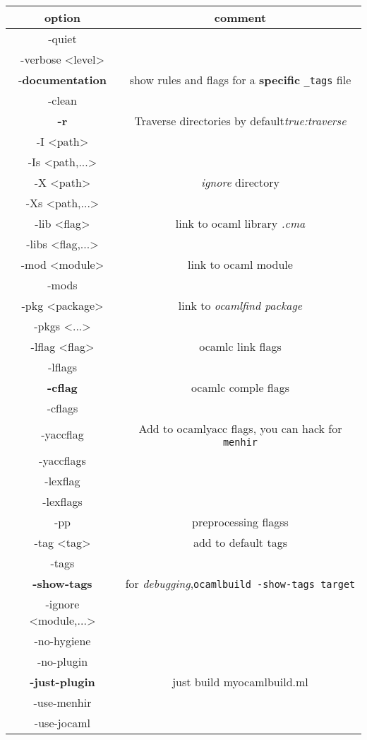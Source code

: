 \begin{longtable}{|c|c|}
  \hline
option & comment \\
  \endfirsthead
\hline
-quiet & \\
-verbose <level> & \\
-\textbf{documentation} & show rules and flags for a \textbf{specific} \verb|_tags| file
\\
-clean & \\
\textbf{-r} & Traverse directories by default\textit{true:traverse} \\
-I <path> & \\
-Is <path,...> & \\
-X <path> & \textit{ignore} directory \\
-Xs <path,...> & \\
-lib <flag> & link to ocaml library \textit{.cma} \\
-libs <flag,...> & \\
-mod <module> & link to ocaml module \\
-mods & \\
-pkg <package> & link to \textit{ocamlfind package} \\
-pkgs <...> & \\
-lflag  <flag> & ocamlc link flags \\
-lflags & \\
\textbf{-cflag} & ocamlc comple flags \\
-cflags & \\
-yaccflag &  Add to ocamlyacc flags, you can hack for \verb|menhir| \\
-yaccflags & \\
-lexflag & \\
-lexflags & \\
-pp & preprocessing flagss\\
-tag <tag> & add to default tags \\
-tags & \\
\textbf{-show-tags} & for \textit{debugging},\verb|ocamlbuild -show-tags target| \\
-ignore <module,...> & \\
-no-hygiene & \\
-no-plugin & \\
\textbf{-just-plugin} & just build myocamlbuild.ml \\
-use-menhir & \\
-use-jocaml & \\

\end{longtable}
